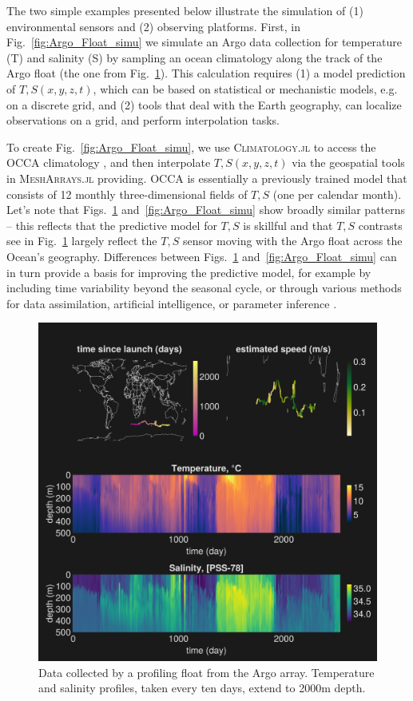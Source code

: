 \documentclass{juliacon}[12pt]
\newcommand{\pkg}[1]{{\small \textsc{#1}}}
\begin{document}
The two simple examples presented below illustrate the simulation of (1) environmental sensors and (2) observing platforms. First, in Fig.~\ref{fig:Argo_Float_simu} we simulate an Argo data collection for temperature (T) and salinity (S) by sampling an ocean climatology along the track of the Argo float (the one from Fig.~\ref{fig:Argo_Float}). This calculation requires (1) a model prediction of $T,S(x,y,z,t)$, which can be based on statistical or mechanistic models, e.g. on a discrete grid, and (2) tools that deal with the Earth geography, can localize observations on a grid, and perform interpolation tasks. 

To create Fig.~\ref{fig:Argo_Float_simu}, we use \pkg{Climatology.jl} to access the OCCA climatology \cite{Forget2010}, and then interpolate $T,S(x,y,z,t)$ via the geospatial tools in \pkg{MeshArrays.jl} providing. OCCA is essentially a previously trained model that consists of 12 monthly three-dimensional fields of $T,S$ (one per calendar month). Let's note that Figs.~\ref{fig:Argo_Float} and~\ref{fig:Argo_Float_simu} show broadly similar patterns -- this reflects that the predictive model for $T,S$ is skillful and that $T,S$ contrasts see in Fig.~\ref{fig:Argo_Float} largely reflect the $T,S$ sensor moving with the Argo float across the Ocean's geography. Differences between Figs.~\ref{fig:Argo_Float} and~\ref{fig:Argo_Float_simu} can in turn provide a basis for improving the predictive model, for example by including time variability beyond the seasonal cycle, or through various methods for data assimilation, artificial intelligence, or parameter inference \cite{Forget2010,Forget2015a,FFL15,FP15,Forget2024b}.

\begin{figure}[t]
\centerline{\includegraphics[width=\columnwidth]{figs/20240528_Argo_6900900.png}}
\caption{Data collected by a profiling float from the Argo array. Temperature and salinity profiles, taken every ten days, extend to 2000m depth.}
\label{fig:Argo_Float}
\end{figure}
\end{document}
